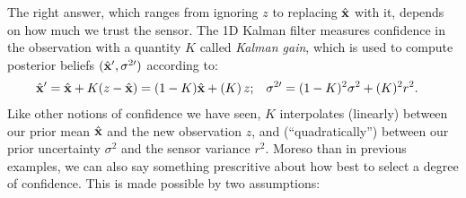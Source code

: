 \begin{example}
The right answer, which ranges from ignoring $z$ to replacing $\hat{\mathbf x}$ with it, depends on how much we trust the sensor.
The 1D Kalman filter measures confidence in the observation with a quantity $K$ called \emph{Kalman gain}, which is used to compute posterior beliefs
$(\hat{\mathbf x}', {\sigma^{2\prime}})$
according to:
\begin{align*}
	\hat{\mathbf x}' &= \hat{\mathbf x} + K (z - \hat{\mathbf x})
         = (1-K) \hat{\mathbf x} + (K)\,z
	;&
	\sigma^{2\prime} &= (1 - K)^2 \sigma^2 + (K)^2 r^2.
\end{align*}
Like other notions of confidence we have seen, $K$
interpolates (linearly) between our prior mean $\hat{\mathbf x}$ and the new observation $z$, and (``quadratically'') between our prior uncertainty $\sigma^2$ and the sensor variance $r^2$.
%
Moreso than in previous examples,
we can also say something prescritive about how best to select
a degree of confidence.
This is made possible by two assumptions:
\end{example}
